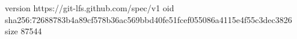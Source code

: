 version https://git-lfs.github.com/spec/v1
oid sha256:72688783b4a89cf578b36ac569bbd40fe51fcef055086a4115e4f55c3dec3826
size 87544
